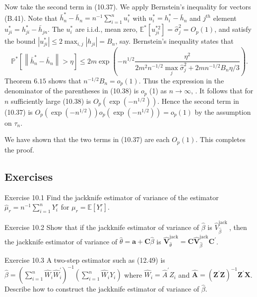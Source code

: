 \documentclass[10pt]{article}
\begin{document}
Now take the second term in (10.37). We apply Bernstein's inequality for vectors (B.41). Note that $\bar{h}_{n}^{*}-\bar{h}_{n}=n^{-1} \sum_{i=1}^{n} u_{i}^{*}$ with $u_{i}^{*}=h_{i}^{*}-\bar{h}_{n}$ and $j^{t h}$ element $u_{j i}^{*}=h_{j i}^{*}-\bar{h}_{j n}$. The $u_{i}^{*}$ are i.i.d., mean zero, $\mathbb{E}^{*}\left[u_{j i}^{* 2}\right]=\widehat{\sigma}_{j}^{2}=O_{p}(1)$, and satisfy the bound $\left|u_{j i}^{*}\right| \leq 2 \max _{i, j}\left|h_{j i}\right|=B_{n}$, say. Bernstein's inequality states that
$$
\mathbb{P}^{*}\left[\left\|\bar{h}_{n}^{*}-\bar{h}_{n}\right\|>\eta\right] \leq 2 m \exp \left(-n^{1 / 2} \frac{\eta^{2}}{2 m^{2} n^{-1 / 2} \max _{j} \widehat{\sigma}_{j}^{2}+2 m n^{-1 / 2} B_{n} \eta / 3}\right) .
$$
Theorem $6.15$ shows that $n^{-1 / 2} B_{n}=o_{p}(1)$. Thus the expression in the denominator of the parentheses in (10.38) is $o_{p}$ (1) as $n \rightarrow \infty$, . It follows that for $n$ sufficiently large (10.38) is $O_{p}\left(\exp \left(-n^{1 / 2}\right)\right)$. Hence the second term in (10.37) is $O_{p}\left(\exp \left(-n^{1 / 2}\right)\right) o_{p}\left(\exp \left(-n^{1 / 2}\right)\right)=o_{p}(1)$ by the assumption on $\tau_{n}$.

We have shown that the two terms in (10.37) are each $O_{p}(1)$. This completes the proof.

\subsection{Exercises}
Exercise 10.1 Find the jackknife estimator of variance of the estimator $\widehat{\mu}_{r}=n^{-1} \sum_{i=1}^{n} Y_{i}^{r}$ for $\mu_{r}=\mathbb{E}\left[Y_{i}^{r}\right]$.

Exercise 10.2 Show that if the jackknife estimator of variance of $\widehat{\beta}$ is $\widehat{V}_{\widehat{\beta}}^{\text {jack }}$, then the jackknife estimator of variance of $\widehat{\theta}=\boldsymbol{a}+\boldsymbol{C} \widehat{\beta}$ is $\widehat{\boldsymbol{V}}_{\widehat{\theta}}^{\mathrm{jack}}=\boldsymbol{C} \widehat{\boldsymbol{V}}_{\widehat{\beta}}^{\mathrm{jack}} \boldsymbol{C}^{\prime}$.

Exercise 10.3 A two-step estimator such as (12.49) is $\widehat{\beta}=\left(\sum_{i=1}^{n} \widehat{W}_{i} \widehat{W}_{i}^{\prime}\right)^{-1}\left(\sum_{i=1}^{n} \widehat{W}_{i} Y_{i}\right)$ where $\widehat{W}_{i}=\widehat{A}^{\prime} Z_{i}$ and $\widehat{\boldsymbol{A}}=\left(\boldsymbol{Z}^{\prime} \boldsymbol{Z}\right)^{-1} \boldsymbol{Z}^{\prime} \boldsymbol{X}$. Describe how to construct the jackknife estimator of variance of $\widehat{\beta}$.
\end{document}
